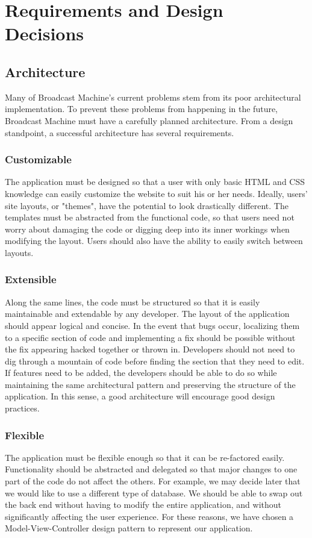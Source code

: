 \documentclass[a4paper,12pt]{report}
\begin{document}
\chapter{Requirements and Design Decisions}
\section{Architecture}
Many of Broadcast Machine's current problems stem from its poor architectural implementation. 
To prevent these problems from happening in the future, Broadcast Machine must have a carefully planned architecture. 
From a design standpoint, a successful architecture has several requirements. 


\subsection{Customizable} %
The application must be designed so that a user with only basic HTML and CSS knowledge can easily customize the website to suit his or her needs. 
Ideally, users' site layouts, or "themes", have the potential to look drastically different. 
The templates must be abstracted from the functional code, so that users need not worry about damaging the code or digging deep into its inner workings when modifying the layout. 
Users should also have the ability to easily switch between layouts. 


\subsection{Extensible} 
Along the same lines, the code must be structured so that it is easily maintainable and extendable by any developer. 
The layout of the application should appear logical and concise. 
In the event that bugs occur, localizing them to a specific section of code and implementing a fix should be possible without the fix appearing hacked together or thrown in. 
Developers should not need to dig through a mountain of code before finding the section that they need to edit. 
If features need to be added, the developers should be able to do so while maintaining the same architectural pattern and preserving the structure of the application. 
In this sense, a good architecture will encourage good design practices. 


\subsection{Flexible}
The application must be flexible enough so that it can be re-factored easily. 
Functionality should be abstracted and delegated so that major changes to one part of the code do not affect the others. 
For example, we may decide later that we would like to use a different type of database. 
We should be able to swap out the back end without having to modify the entire application, and without significantly affecting the user experience. 
For these reasons, we have chosen a Model-View-Controller design pattern to represent our application. 
\end{document}
